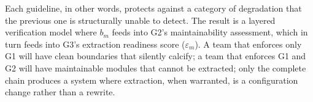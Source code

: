 Each guideline, in other words, protects against a category of degradation that the previous one is structurally unable to detect. The result is a layered verification model where $b_m$ feeds into G2's maintainability assessment, which in turn feeds into G3's extraction readiness score ($\varepsilon_m$). A team that enforces only G1 will have clean boundaries that silently calcify; a team that enforces G1 and G2 will have maintainable modules that cannot be extracted; only the complete chain produces a system where extraction, when warranted, is a configuration change rather than a rewrite.